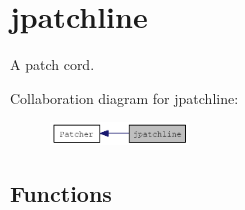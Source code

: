\hypertarget{group__jpatchline}{
\section{jpatchline}
\label{group__jpatchline}
}


A patch cord.  


Collaboration diagram for jpatchline:\nopagebreak
\begin{figure}[H]
\begin{center}
\leavevmode
\includegraphics[width=104pt]{group__jpatchline}
\end{center}
\end{figure}
\subsection*{Functions}
